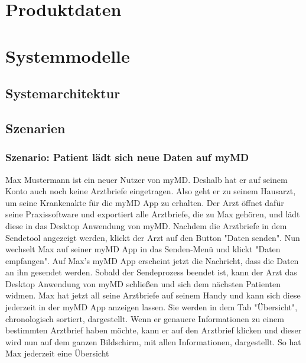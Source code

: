 \documentclass[a4paper]{scrreprt}
\begin{document}
\chapter{Produktdaten}

\chapter{Systemmodelle}
\section{Systemarchitektur}
\section{Szenarien}
\subsection{Szenario: Patient lädt sich neue Daten auf myMD}
Max Mustermann ist ein neuer Nutzer von myMD. Deshalb hat er auf seinem Konto auch noch keine Arztbriefe eingetragen. Also geht er zu seinem Hausarzt, um seine Krankenakte für die myMD \gls{App} zu erhalten. Der Arzt öffnet dafür seine Praxissoftware und exportiert alle Arztbriefe, die zu Max gehören, und lädt diese in das \gls{Desktop Anwendung} von myMD. Nachdem die Arztbriefe in dem Sendetool angezeigt werden, klickt der Arzt auf den Button "Daten senden". Nun wechselt Max auf seiner myMD \gls{App} in das Senden-Menü und klickt "Daten empfangen". Auf Max's myMD \gls{App} erscheint jetzt die Nachricht, dass die Daten an ihn gesendet werden. Sobald der Sendeprozess beendet ist, kann der Arzt das \gls{Desktop Anwendung} von myMD schließen und sich dem nächsten Patienten widmen. Max hat jetzt all seine Arztbriefe auf seinem Handy und kann sich diese jederzeit in der myMD \gls{App} anzeigen lassen. Sie werden in dem Tab "Übersicht", chronologisch sortiert, dargestellt. Wenn er genauere Informationen zu einem bestimmten Arztbrief haben möchte, kann er auf den Arztbrief klicken und dieser wird nun auf dem ganzen Bildschirm, mit allen Informationen, dargestellt. So hat Max jederzeit eine Übersicht
\end{document}
